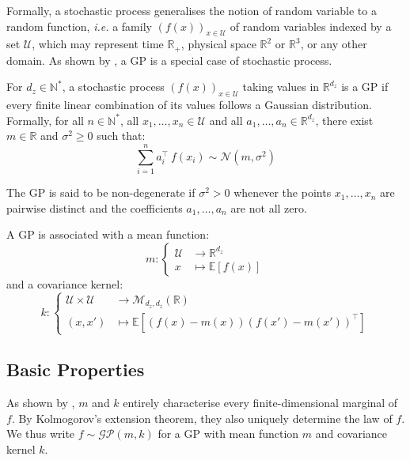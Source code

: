 Formally, a stochastic process generalises the notion of random variable to a random function, \textit{i.e.} a family $(f(x))_{x\in\mathcal{U}}$ of random variables indexed by a set $\mathcal{U}$, which may represent time $\mathbb{R}_+$, physical space $\mathbb{R}^2$ or $\mathbb{R}^3$, or any other domain. As shown by , a GP is a special case of stochastic process.

\begin{definition}\label{th:GP_definition}
	For $d_z\in\mathbb{N}^*$, a stochastic process $(f(x))_{x\in\mathcal{U}}$ taking values in $\mathbb{R}^{d_z}$ is a GP if every finite linear combination of its values follows a Gaussian distribution. Formally, for all $n\in\mathbb{N}^*$, all $x_1,\dots,x_n\in\mathcal{U}$ and all $a_1,\dots,a_n\in\mathbb{R}^{d_z}$, there exist $m\in\mathbb{R}$ and $\sigma^2\geq0$ such that:
	\begin{equation}
		\sum_{i=1}^na_i^\top\:f(x_i)\sim\mathcal{N}(m,\sigma^2)
	\end{equation}

	The GP is said to be non-degenerate if $\sigma^2>0$ whenever the points $x_1,\dots,x_n$ are pairwise distinct and the coefficients $a_1,\dots,a_n$ are not all zero.
\end{definition}

A GP is associated with a mean function:
\begin{equation}
	m:\left\{\begin{aligned}
	\mathcal{U}&\rightarrow\mathbb{R}^{d_z}\\
	x&\mapsto\mathbb{E}[f(x)]
	\end{aligned}\right.
\end{equation}
and a covariance kernel:
\begin{equation}
	k:\left\{\begin{aligned}
	\mathcal{U}\times\mathcal{U}&\rightarrow\mathcal{M}_{d_z,d_z}(\mathbb{R})\\
	(x,x')&\mapsto\mathbb{E}\left[(f(x)-m(x))(f(x')-m(x'))^\top\right]
	\end{aligned}\right.
\end{equation}

\subsection{Basic Properties}

As shown by , $m$ and $k$ entirely characterise every finite-dimen\-sional marginal of $f$. By Kolmogorov's extension theorem, they also uniquely determine the law of $f$. We thus write $f\sim\mathcal{GP}(m,k)$ for a GP with mean function $m$ and covariance kernel $k$.


